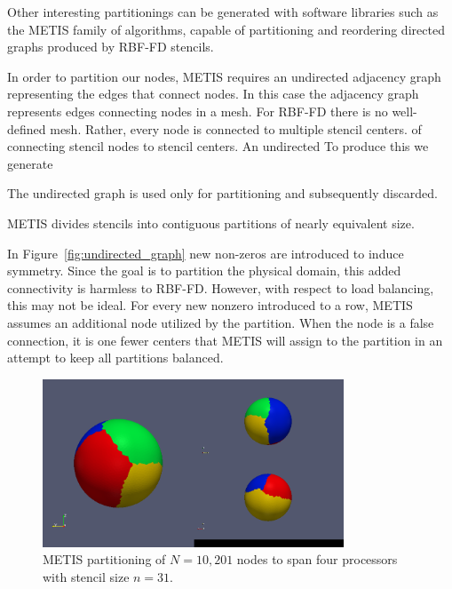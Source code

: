 \documentclass{report}
\begin{document}
Other interesting partitionings can be generated with software libraries such as the METIS \cite{Karypis1999} family of algorithms, capable of partitioning and reordering directed graphs produced by RBF-FD stencils. 




In order to partition our nodes, METIS requires an undirected adjacency graph representing the edges that connect nodes. In this case the adjacency graph represents edges connecting nodes in a mesh. For RBF-FD there is no well-defined mesh. Rather, every node is connected to multiple stencil centers.  of connecting stencil nodes to stencil centers. An undirected  To produce this we generate 

The undirected graph is used only for partitioning and subsequently discarded. 

METIS divides stencils into contiguous partitions of nearly equivalent size. 


In Figure~\ref{fig:undirected_graph} new non-zeros are introduced to induce symmetry. Since the goal is to partition the physical domain, this added connectivity is harmless to RBF-FD. However, with respect to load balancing, this may not be ideal. For every new nonzero introduced to a row, METIS assumes an additional node utilized by the partition. When the node is a false connection, it is one fewer centers that METIS will assign to the partition in an attempt to keep all partitions balanced. 



\begin{figure}[ht!]
\begin{center}
\includegraphics[width=0.8\textwidth]{rbffd_methods_content/decompositions/gpmetis_decomp_sphere_4parts.png}
\caption{METIS partitioning of $N=10,201$ nodes to span four processors with stencil size $n=31$. }
\label{fig:metis_decomposed_sphere}
\end{center}
\end{figure}
\end{document}
